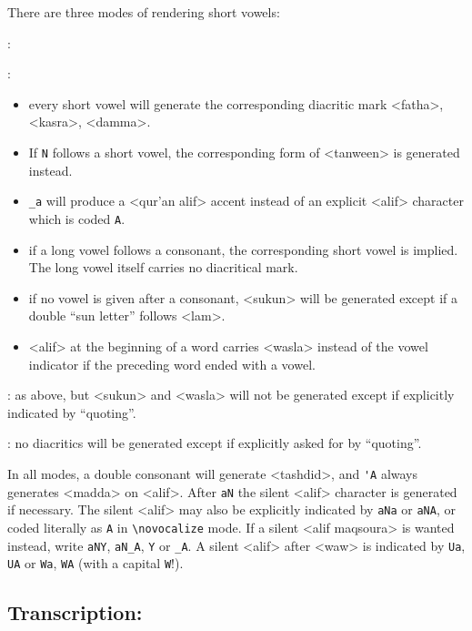 \documentclass[pagesize=auto]{scrartcl}
\newcommand*{\symb}[1]{\textsf{\textlangle#1\textrangle}}
\def\symb#1{<#1>}%
\begin{document}
There are three modes of rendering short vowels:
%
\begin{labeling}{\texttt{\string\fullvocalize}:}
\item[\texttt{\string\fullvocalize}:]
  \begin{itemize}
  \item every short vowel will generate the corresponding diacritic mark 
    \symb{fatha}, \symb{kasra}, \symb{damma}. 
  \item If \verb+N+ follows a short vowel, the corresponding form of \symb{tanween} is 
    generated instead.
  \item \verb+_a+ will produce a \symb{qur'an alif} accent instead of an explicit 
    \symb{alif} character which is coded \verb+A+. 
  \item if a long vowel follows a consonant, the corresponding short vowel is 
    implied. The long vowel itself carries no diacritical mark.
  \item if no vowel is given after a consonant, \symb{sukun} will be generated 
    except if a double ``sun letter'' follows \symb{lam}. 
  \item \symb{alif} at the beginning of a word carries \symb{wasla} instead of the vowel 
    indicator if the preceding word ended with a vowel.
  \end{itemize}
\item[\texttt{\string\vocalize}:] as above, but \symb{sukun} and \symb{wasla} will not be generated except 
  if explicitly indicated by ``quoting''.
\item[\texttt{\string\novocalize}:] no diacritics will be generated except if explicitly asked for 
  by ``quoting''.
\end{labeling}
%
In all modes, a double consonant will generate \symb{tashdid}, and \verb+'A+ always 
generates \symb{madda} on \symb{alif}. After \verb+aN+ the silent \symb{alif} character is 
generated if necessary. The silent \symb{alif} may also be explicitly indicated 
by \verb+aNa+ or \verb+aNA+, or coded literally as \verb+A+ in \verb+\novocalize+ mode. If a 
silent \symb{alif maqsoura} is wanted instead, write \verb+aNY+, \verb+aN_A+, \verb+Y+ or \verb+_A+. 
A silent \symb{alif} after \symb{waw} is indicated by \verb+Ua+, \verb+UA+ or \verb+Wa+, \verb+WA+ (with 
a capital \verb+W+!).


\subsection{Transcription:}
\end{document}
